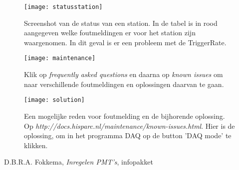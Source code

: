 \begin{figure} 
\centering 
\texttt{[image: statusstation]}
\caption{Screenshot van de status van een station. In de tabel is in rood aangegeven 
welke foutmeldingen er voor het station zijn waargenomen. 
In dit geval is er een probleem met de TriggerRate.}\label{fig:statusstation} 
\end{figure}

\begin{figure} 
\centering 
\texttt{[image: maintenance]}
\caption{Klik op \emph{frequently asked questions} en daarna op \emph{known issues} om naar verschillende foutmeldingen en oplossingen daarvan te gaan.}\label{fig:maintenance} 
\end{figure}
 
\begin{figure} 
\centering 
\texttt{[image: solution]}
\caption{Een mogelijke reden voor foutmelding en de bijhorende oplossing. Op \emph{http://docs.hisparc.nl/maintenance/known-issues.html}. 
Hier is de oplossing, om in het programma \hisparc DAQ op de button 'DAQ mode'  te klikken.} 
\label{fig:solution} 
\end{figure}




\begin{thebibliography}{9} 
	
	 D.B.R.A. Fokkema, \emph{Inregelen PMT's}, infopakket \hisparc 
\end{thebibliography}




